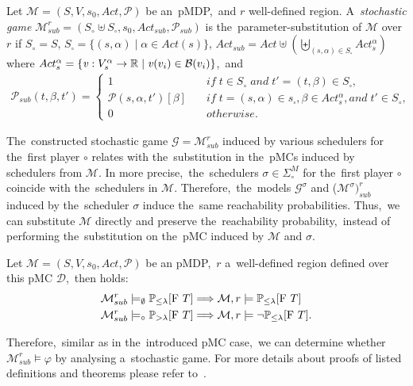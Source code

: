 \begin{definition} \label{def:sub_mdp}
Let $\mathcal{M} = (S, V, s_0, Act, \mathcal{P})$ be an~pMDP,~and $r$ well-defined region.
A~\textit{stochastic game} $\mathcal{M}_{sub}^r = (S_{\circ} \uplus S_{\square}, s_0, Act_{sub}, \mathcal{P}_{sub})$ is the~parameter-substitution of $\mathcal{M}$ over $r$ if $S_{\circ} = S$, $S_{\square} = \{ (s, \alpha) \; \lvert \; \alpha \in Act(s) \}$, $Act_{sub} = Act \uplus (\biguplus_{(s, \alpha) \in S_{\square}}Act_s^\alpha)$ where $Act_s^\alpha = \{\mathit{v}: V_s^\alpha \rightarrow \mathbb{R} \; \lvert \; \mathit{v}(v_i) \in \mathcal{B}(v_i) \}$,~and
\begin{align*}
    \mathcal{P}_{sub}(t, \beta, t') = 
    \begin{cases}
        1 \quad & if \; t \in S_\circ \; and \; t' = (t, \beta) \in S_\square, \\
        \mathcal{P}(s, \alpha, t')[\beta] \quad & if \; t = (s, \alpha) \in s_\square, \beta \in Act_s^\alpha, and \; t' \in S_\circ, \\
        0 \quad & otherwise.
    \end{cases}
\end{align*}
\end{definition}
\noindent
The~constructed stochastic game $\mathcal{G} = \mathcal{M}_{sub}^r$ induced by various schedulers for the~first player $\circ$ relates with the~substitution in the~pMCs induced by schedulers from $\mathcal{M}$. 
In more precise,~the~schedulers $\sigma \in \Sigma^M_\circ$ for the~first player $\circ$ coincide with the~schedulers in $\mathcal{M}$.
Therefore,~the~models $\mathcal{G}^\sigma$ and ($\mathcal{M}^\sigma)_{sub}^r$ induced by the~scheduler $\sigma$ induce the~same reachability probabilities.
Thus,~we can substitute $\mathcal{M}$ directly and preserve the~reachability probability,~instead of performing the~substitution on the~pMC induced by $\mathcal{M}$ and $\sigma$.

\begin{theorem} \label{the:mdp_stochastic}
Let $\mathcal{M} = (S, V, s_0, Act, \mathcal{P})$ be an pMDP,~$r$ a~well-defined region defined over this pMC $\mathcal{D}$,~then holds:
\begin{align*}
    \mathcal{M}_{sub}^{r} \models_{\emptyset} \mathbb{P}_{\leq \lambda}[\mathrm{F}\ T] \Longrightarrow \mathcal{M}, r \models & \; \mathbb{P}_{\leq \lambda}[\mathrm{F}\ T] \\
    \mathcal{M}_{sub}^{r} \models_{\circ} \mathbb{P}_{> \lambda}[\mathrm{F}\ T] \Longrightarrow \mathcal{M}, r \models & \; \neg\mathbb{P}_{\leq \lambda}[\mathrm{F}\ T].
\end{align*}
\end{theorem}
\noindent
Therefore,~similar as in the~introduced pMC case,~we can determine whether $\mathcal{M}_{sub}^r \models \varphi$ by analysing a~stochastic game.
For more details about proofs of listed definitions and theorems please refer to~\cite{Quatmann2016}.



